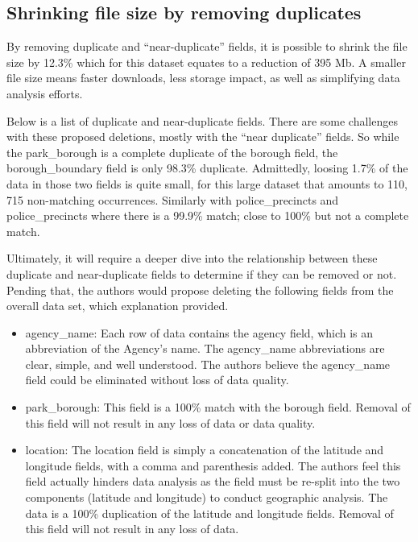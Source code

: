 \documentclass[12pt, titlepage]{article}
\begin{document}
{ \subsection{Shrinking file size by removing duplicates}
 
 By removing duplicate and ``near-duplicate'' fields, it is possible to shrink the file size by 12.3\%
 which for this dataset equates to a reduction of 395 Mb. A smaller file size means faster downloads,
 less storage impact, as well as simplifying data analysis efforts.  
 
 Below is a list of duplicate and near-duplicate fields. There are some challenges with these proposed deletions, 
 mostly with the ``near duplicate'' fields.  So while the park\_borough is a complete duplicate of the borough
 field, the borough\_boundary field is only 98.3\% duplicate. Admittedly, loosing 1.7\% of the data in those two
 fields is quite small, for this large dataset that amounts to 110, 715 non-matching occurrences. Similarly with 
 police\_precincts and police\_precincts where there is a 99.9\% match; close to 100\% but not a complete match.

Ultimately, it will require a deeper dive into the relationship between these duplicate and near-duplicate fields to
 determine if they can be removed or not. Pending that, the authors would propose deleting the following fields
 from the overall data set, which explanation provided.
 
 	\begin{itemize}
		    \item agency\_name: Each row of data contains the agency field, which is an abbreviation of the Agency's name.
		    The agency\_name abbreviations are clear, simple, and well understood. The authors believe the agency\_name field could
		    be eliminated without loss of data quality. 
		    
		    \item park\_borough:  This field is a 100\% match with the borough field. Removal of this field will not result in any loss
		    of data or data quality.
		    
		    \item location:  The location field is simply a concatenation of the latitude and longitude fields, with a comma and 
		    parenthesis added. The authors feel this field actually hinders data analysis as the
		    field must be re-split into the two components (latitude and longitude) to conduct geographic analysis.
		     The data is a 100\% duplication of the latitude and longitude fields. Removal of this field will
		    not result in any loss of data.
		    

\end{itemize}}
\end{document}
